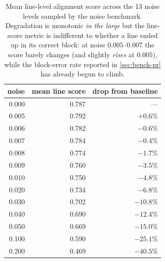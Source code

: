 \documentclass{article}
\theoremstyle{definition}
\begin{document}
\begin{table}[h]
      \centering
      \small
      \begin{tabular}{rrr}
            \toprule
            \textbf{noise} & \textbf{mean line score} & \textbf{drop from baseline} \\
            \midrule
            0.000          & 0.787                    & ---                         \\
            0.005          & 0.792                    & $+0.6\%$                    \\
            0.006          & 0.782                    & $-0.6\%$                    \\
            0.007          & 0.784                    & $-0.4\%$                    \\
            0.008          & 0.774                    & $-1.7\%$                    \\
            0.009          & 0.760                    & $-3.5\%$                    \\
            0.010          & 0.750                    & $-4.8\%$                    \\
            0.020          & 0.734                    & $-6.8\%$                    \\
            0.030          & 0.702                    & $-10.8\%$                   \\
            0.040          & 0.690                    & $-12.4\%$                   \\
            0.050          & 0.669                    & $-15.0\%$                   \\
            0.100          & 0.590                    & $-25.1\%$                   \\
            0.200          & 0.469                    & $-40.5\%$                   \\
            \bottomrule
      \end{tabular}
      \caption{Mean line-level alignment score across the 13 noise
            levels sampled by the noise benchmark.  Degradation is
            monotonic \emph{in the large} but the line-score metric
            is indifferent to whether a line ended up in its correct
            block: at noise $0.005$--$0.007$ the score barely changes
            (and slightly \emph{rises} at $0.005$), while the
            block-error rate reported in \cref{sec:bench-pr} has
            already begun to climb.}
      \label{tab:bench-noise}
\end{table}
\end{document}
